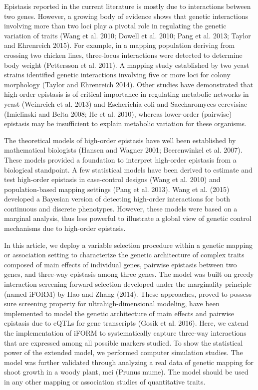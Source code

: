 \documentclass[]{book}
\theoremstyle{definition}
\theoremstyle{definition}
\theoremstyle{remark}
\begin{document}
Epistasis reported in the current literature is mostly due to
interactions between two genes. However, a growing body of evidence
shows that genetic interactions involving more than two loci play a
pivotal role in regulating the genetic variation of traits (Wang et al.
2010; Dowell et al. 2010; Pang et al. 2013; Taylor and Ehrenreich 2015).
For example, in a mapping population deriving from crossing two chicken
lines, three-locus interactions were detected to determine body weight
(Pettersson et al. 2011). A mapping study established by two yeast
strains identified genetic interactions involving five or more loci for
colony morphology (Taylor and Ehrenreich 2014). Other studies have
demonstrated that high-order epistasis is of critical importance in
regulating metabolic networks in yeast (Weinreich et al. 2013) and
Escherichia coli and Saccharomyces cerevisiae (Imielinski and Belta
2008; He et al. 2010), whereas lower-order (pairwise) epistasis may be
insufficient to explain metabolic variation for these organisms.

The theoretical models of high-order epistasis have well been
established by mathematical biologists (Hansen and Wagner 2001;
Beerenwinkel et al. 2007). These models provided a foundation to
interpret high-order epistasis from a biological standpoint. A few
statistical models have been derived to estimate and test high-order
epistasis in case-control designs (Wang et al. 2010) and
population-based mapping settings (Pang et al. 2013). Wang et al. (2015)
developed a Bayesian version of detecting high-order interactions for
both continuous and discrete phenotypes. However, these models were
based on a marginal analysis, thus less powerful to illustrate a global
view of genetic control mechanisms due to high-order epistasis.

In this article, we deploy a variable selection procedure within a
genetic mapping or association setting to characterize the genetic
architecture of complex traits composed of main effects of individual
genes, pairwise epistasis between two genes, and three-way epistasis
among three genes. The model was built on greedy interaction screening
forward selection developed under the marginality principle (named
iFORM) by Hao and Zhang (2014). These approaches, proved to possess sure
screening property for ultrahigh-dimensional modeling, have been
implemented to model the genetic architecture of main effects and
pairwise epistasis due to eQTLs for gene transcripts (Gosik et al.
2016). Here, we extend the implementation of iFORM to systematically
capture three-way interactions that are expressed among all possible
markers studied. To show the statistical power of the extended model, we
performed computer simulation studies. The model was further validated
through analyzing a real data of genetic mapping for shoot growth in a
woody plant, mei (Prunus mume). The model should be used in any other
mapping or association studies of quantitative traits.
\end{document}

